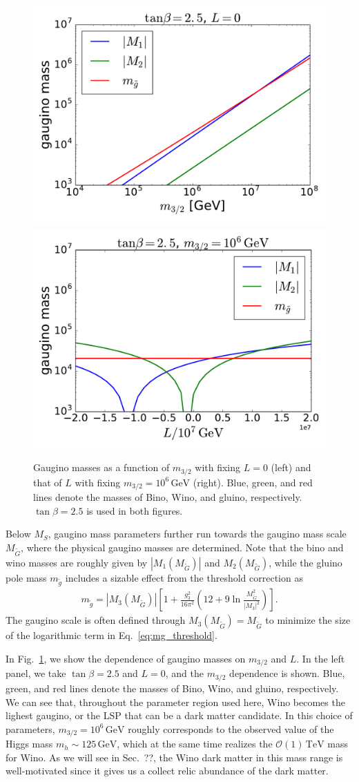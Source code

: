 \documentclass[12pt,twoside,book]{article}
\begin{document}
\begin{figure}
  \centering
  \includegraphics[width=0.48\hsize]{amsb_m32.pdf}
  \includegraphics[width=0.48\hsize]{amsb_L.pdf}
  \caption{
    Gaugino masses as a function of $m_{3/2}$ with fixing $L = 0$ (left) and that of $L$ with fixing $m_{3/2} = 10^6\,\mathrm{GeV}$ (right).
    Blue, green, and red lines denote the masses of Bino, Wino, and gluino, respectively.
    $\tan\beta = 2.5$ is used in both figures.
  }
  \label{fig:amsb_spectrum}
\end{figure}

Below $M_S$, gaugino mass parameters further run towards the gaugino mass scale $M_{\tilde{G}}$, where the physical gaugino masses are determined.
Note that the bino and wino masses are roughly given by $|M_1 (M_{\tilde{G}})|$ and $M_2 (M_{\tilde{G}})$, while the gluino pole mass $m_{\tilde{g}}$ includes a sizable effect from the threshold correction as \cite{Giudice:2004tc}
\begin{align}
  m_{\tilde{g}} = \left| M_3 (M_{\tilde{G}}) \right| \left[
  1 + \frac{g_3^2}{16\pi^2} \left( 12 + 9\ln \frac{M_{\tilde{G}}^2}{|M_3|^2} \right)
  \right].
  \label{eq:mg_threshold}
\end{align}
The gaugino scale is often defined through $M_3 (M_{\tilde{G}}) = M_{\tilde{G}}$ to minimize the size of the logarithmic term in Eq.~\eqref{eq:mg_threshold}.

In Fig.~\ref{fig:amsb_spectrum}, we show the dependence of gaugino masses on $m_{3/2}$ and $L$.
In the left panel, we take $\tan\beta = 2.5$ and $L=0$, and the $m_{3/2}$ dependence is shown.
Blue, green, and red lines denote the masses of Bino, Wino, and gluino, respectively.
We can see that, throughout the parameter region used here, Wino becomes the lighest gaugino, or the LSP that can be a dark matter candidate.
In this choice of parameters, $m_{3/2} = 10^6\,\mathrm{GeV}$ roughly corresponds to the observed value of the Higgs mass $m_h \sim 125\,\mathrm{GeV}$, which at the same time realizes the $\mathcal{O}(1)\,\mathrm{TeV}$ mass for Wino.
As we will see in Sec.~??,  the Wino dark matter in this mass range is well-motivated since it gives us a collect relic abundance of the dark matter.
\end{document}
